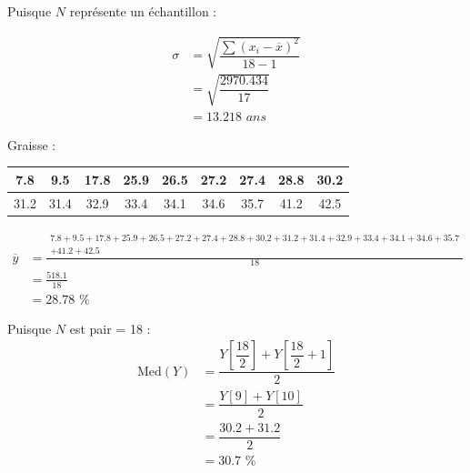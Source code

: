 \documentclass{article}
\begin{document}
\begin{enumerate}
\vspace{0.35cm}

Puisque \(N\) représente un échantillon :

\begin{align*}
        \sigma & =\sqrt{\dfrac{\sum (x_i - \overline{x})^2}{18-1}}\\ 
               & = \sqrt{\dfrac{2970.434}{17}}\\
               & =\boxed{13.218 \textit{ ans}}
\end{align*}


\newpage


Graisse : 


\begin{center}
\begin{tabular}{ |c|c|c|c|c|c|c|c|c|} 
    \hline
    7.8 & 9.5 & 17.8 & 25.9 & 26.5  & 27.2 & 27.4 & 28.8 & 30.2\\
    \hline
    31.2 & 31.4 &  32.9 & 33.4 & 34.1 & 34.6 & 35.7 & 41.2 & 42.5   \\
    \hline

\end{tabular}
\end{center}


\begin{align*}
    \overline{y} &= \frac{
                    \substack {7.8 + 9.5 + 17.8 + 25.9 + 26.5  + 27.2 + 27.4 + 28.8 + 30.2 +31.2 + 31.4 +  32.9 + 33.4+ 34.1 + 34.6 + 35.7 \\
                        + 41.2 + 42.5}
                }{18}\\
                     &= \frac{518.1}{18}\\
                     &= \boxed { 28.78 \textit{ \%}}
    \end{align*}

    \vspace{0.5cm}

Puisque \(N\) est pair = 18 :
    \begin{align*}
        \text{Med}(Y) &= \dfrac{Y\!\left[\dfrac{18}{2}\right] + Y\!\left[\dfrac{18}{2} + 1\right]}{2} \\[0.3cm]
                      &= \dfrac{Y\!\left[9\right] + Y\!\left[10\right]}{2} \\[0.3cm]
                      &= \dfrac{30.2 + 31.2}{2} \\[0.3cm]
                      &=\boxed{30.7\textit{ \%}}
    \end{align*}


\end{enumerate}
\end{document}

